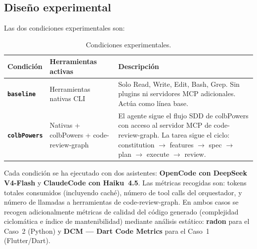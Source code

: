 \documentclass[11pt, letterpaper]{article}
\begin{document}
\subsection{Diseño experimental}
\label{sec:diseno_experimental}
Las dos condiciones experimentales son:

\begin{table}[H]
\centering
\begin{tabular}{p{2.4cm} p{4.0cm} p{6.8cm}}
\toprule
\textbf{Condición} & \textbf{Herramientas activas} & \textbf{Descripción} \\
\midrule
\textbf{\texttt{baseline}} & Herramientas nativas CLI & Solo Read, Write, Edit, Bash, Grep. Sin plugins ni servidores MCP adicionales. Actúa como línea base. \\
\textbf{\texttt{colbPowers}} & Nativas + colbPowers + code-review-graph & El agente sigue el flujo SDD de colbPowers con acceso al servidor MCP de code-review-graph. La tarea sigue el ciclo: constitution $\rightarrow$ features $\rightarrow$ spec $\rightarrow$ plan $\rightarrow$ execute $\rightarrow$ review. \\
\bottomrule
\end{tabular}
\caption{Condiciones experimentales.}
\label{tab:condiciones_experimentales}
\end{table}

Cada condición se ha ejecutado con dos asistentes: \textbf{OpenCode con DeepSeek V4-Flash}\cite{deepseek_v4_flash} y \textbf{ClaudeCode con Haiku~4.5}\cite{claude_haiku_45}. Las métricas recogidas son: tokens totales consumidos (incluyendo caché), número de tool calls del orquestador, y número de llamadas a herramientas de code-review-graph. En ambos casos se recogen adicionalmente métricas de calidad del código generado (complejidad ciclomática e índice de mantenibilidad) mediante análisis estático: \textbf{radon} \cite{Lacchia_radon} para el Caso~2 (Python) y \textbf{DCM --- Dart Code Metrics} \cite{dart_code_metrics} para el Caso~1 (Flutter/Dart).
\end{document}
